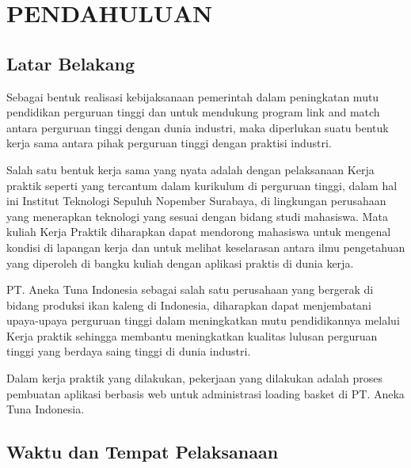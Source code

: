 \chapter{PENDAHULUAN}
\vspace{4ex}

\setlength{\parindent}{7ex}


\section{Latar Belakang}
\vspace{1ex}

Sebagai bentuk realisasi kebijaksanaan pemerintah dalam peningkatan mutu pendidikan perguruan tinggi dan untuk mendukung program link and match antara perguruan tinggi dengan dunia industri, maka diperlukan suatu bentuk kerja sama antara pihak perguruan tinggi dengan praktisi industri.
\vspace{0.5ex}

Salah satu bentuk kerja sama yang nyata adalah dengan pelaksanaan Kerja praktik seperti yang tercantum dalam kurikulum di perguruan tinggi, dalam hal ini Institut Teknologi Sepuluh Nopember Surabaya, di lingkungan perusahaan yang menerapkan teknologi yang sesuai dengan bidang studi mahasiswa.
Mata kuliah Kerja Praktik diharapkan dapat mendorong mahasiswa untuk mengenal kondisi di lapangan kerja dan untuk melihat keselarasan antara ilmu pengetahuan yang diperoleh di bangku kuliah dengan aplikasi praktis di dunia kerja.
\vspace{0.5ex}

PT. Aneka Tuna Indonesia sebagai salah satu perusahaan yang bergerak di bidang produksi ikan kaleng di Indonesia, diharapkan dapat menjembatani upaya-upaya perguruan tinggi dalam meningkatkan mutu pendidikannya melalui Kerja praktik sehingga membantu meningkatkan kualitas lulusan perguruan tinggi yang berdaya saing tinggi di dunia industri.
\vspace{0.5ex}

Dalam kerja praktik yang dilakukan, pekerjaan yang dilakukan adalah proses pembuatan aplikasi berbasis web untuk administrasi loading basket di PT. Aneka Tuna Indonesia.

\newpage

\section{Waktu dan Tempat Pelaksanaan}
\vspace{1ex}

